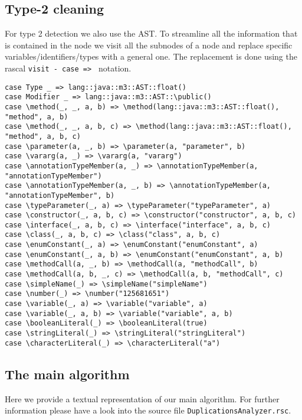 \documentclass{uva-inf-article}
\begin{document}
\subsection{Type-2 cleaning}

For type 2 detection we also use the AST. To streamline all the information that is contained in the node we visit all the subnodes of a node
and replace specific variables/identifiers/types with a general one. The replacement is done using the rascal \texttt{visit - case => } notation.

\begin{verbatim}
case Type _ => lang::java::m3::AST::float()
case Modifier _ => lang::java::m3::AST::\public()
case \method(_, _, a, b) => \method(lang::java::m3::AST::float(), "method", a, b)
case \method(_, _, a, b, c) => \method(lang::java::m3::AST::float(), "method", a, b, c)
case \parameter(a, _, b) => \parameter(a, "parameter", b)
case \vararg(a, _) => \vararg(a, "vararg") 
case \annotationTypeMember(a, _) => \annotationTypeMember(a, "annotationTypeMember")
case \annotationTypeMember(a, _, b) => \annotationTypeMember(a, "annotationTypeMember", b)
case \typeParameter(_, a) => \typeParameter("typeParameter", a)
case \constructor(_, a, b, c) => \constructor("constructor", a, b, c)
case \interface(_, a, b, c) => \interface("interface", a, b, c)
case \class(_, a, b, c) => \class("class", a, b, c)
case \enumConstant(_, a) => \enumConstant("enumConstant", a) 
case \enumConstant(_, a, b) => \enumConstant("enumConstant", a, b)
case \methodCall(a, _, b) => \methodCall(a, "methodCall", b)
case \methodCall(a, b, _, c) => \methodCall(a, b, "methodCall", c)
case \simpleName(_) => \simpleName("simpleName")
case \number(_) => \number("125681651")
case \variable(_, a) => \variable("variable", a) 
case \variable(_, a, b) => \variable("variable", a, b) 
case \booleanLiteral(_) => \booleanLiteral(true)
case \stringLiteral(_) => \stringLiteral("stringLiteral")
case \characterLiteral(_) => \characterLiteral("a")
\end{verbatim}

\subsection{The main algorithm}

Here we provide a textual representation of our main algorithm. For further information please have a look into the source file \texttt{DuplicationsAnalyzer.rsc}.
\end{document}
